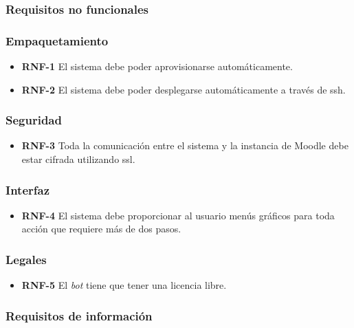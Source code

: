 \subsubsection{Requisitos no funcionales}


\subsubsection*{Empaquetamiento}
\begin{itemize}

\item \textbf{RNF-1} El sistema debe poder aprovisionarse automáticamente.
\item \textbf{RNF-2} El sistema debe poder desplegarse automáticamente a través de ssh.
\end{itemize}
\subsubsection*{Seguridad}
\begin{itemize}
\item \textbf{RNF-3} Toda la comunicación entre el sistema y la instancia de Moodle debe estar cifrada utilizando ssl.
\end{itemize}

\subsubsection*{Interfaz}
\begin{itemize}
\item \textbf{RNF-4} El sistema debe proporcionar al usuario menús gráficos para toda acción que requiere más de dos pasos.
\end{itemize}
\subsubsection*{Legales}
\begin{itemize}
\item \textbf{RNF-5} El \textit{bot} tiene que tener una licencia libre. 

\end{itemize}

\subsubsection{Requisitos de información}

